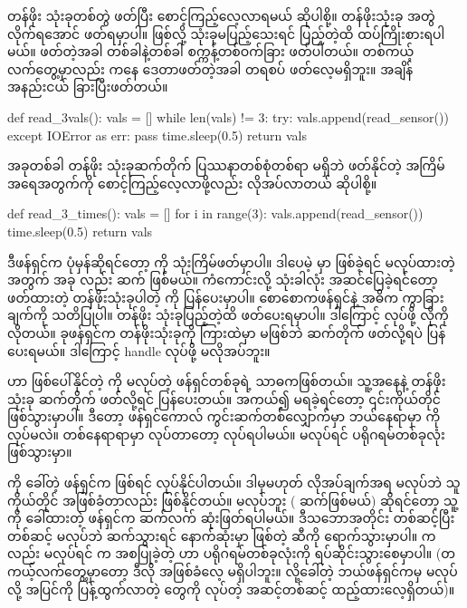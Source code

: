  တန်ဖိုး သုံးခုတစ်တွဲ ဖတ်ပြီး စောင့်ကြည့်လေ့လာရမယ် ဆိုပါစို့။ တန်ဖိုးသုံးခု အတွဲလိုက်ရအောင် ဖတ်ရမှာပါ။  ဖြစ်လို့ သုံးခုမပြည့်သေးရင် ပြည့်တဲ့ထိ ထပ်ကြိုးစားရပါမယ်။  ဖတ်တဲ့အခါ တစ်ခါနဲ့တစ်ခါ စက္ကန့်တစ်ဝက်ခြား ဖတ်ပါတယ်။ တစ်ကယ့် လက်တွေ့မှာလည်း  ကနေ ဒေတာဖတ်တဲ့အခါ တရစပ် ဖတ်လေ့မရှိဘူး။ အချိန်အနည်းငယ် ခြားပြီးဖတ်တယ်။
%
\begin{py}
def read_3vals():
    vals = []
    while len(vals) != 3:
        try:
            vals.append(read_sensor())
        except IOError as err:
            pass
        time.sleep(0.5)
    return vals
\end{py}
%

အခုတစ်ခါ  တန်ဖိုး သုံးခုဆက်တိုက် ပြဿနာတစ်စုံတစ်ရာ မရှိဘဲ ဖတ်နိုင်တဲ့ အကြိမ်အရေအတွက်ကို စောင့်ကြည့်လေ့လာဖို့လည်း လိုအပ်လာတယ် ဆိုပါစို့။ 

%
\begin{py}
def read_3_times():
    vals = []
    for i in range(3):
        vals.append(read_sensor())
        time.sleep(0.5)
    return vals
\end{py}
%
ဒီဖန်ရှင်က ပုံမှန်ဆိုရင်တော့   ကို သုံးကြိမ်ဖတ်မှာပါ။ ဒါပေမဲ့  မှာ   ဖြစ်ခဲ့ရင်  မလုပ်ထားတဲ့အတွက်  အခု  လည်း ဆက်  ဖြစ်မယ်။ ကံကောင်းလို့ သုံးခါလုံး အဆင်ပြေခဲ့ရင်တော့ ဖတ်ထားတဲ့ တန်ဖိုးသုံးခုပါတဲ့  ကို ပြန်ပေးမှာပါ။  စောစောကဖန်ရှင်နဲ့ အဓိက ကွာခြားချက်ကို သတိပြုပါ။  တန်ဖိုး သုံးခုပြည့်တဲ့ထိ ဖတ်ပေးရမှာပါ။ ဒါကြောင့်  လုပ်ဖို့ လိုကို လိုတယ်။ ခုဖန်ရှင်က တန်ဖိုးသုံးခုကို ကြားထဲမှာ  မဖြစ်ဘဲ ဆက်တိုက်  ဖတ်လို့ရပဲ ပြန်ပေးရမယ်။ ဒါကြောင့် {handle} လုပ်ဖို့ မလိုအပ်ဘူး။

 ဟာ ဖြစ်ပေါ်နိုင်တဲ့  ကို  မလုပ်တဲ့ ဖန်ရှင်တစ်ခုရဲ့ သာဓကဖြစ်တယ်။ သူ့အနေနဲ့ တန်ဖိုးသုံးခု ဆက်တိုက် ဖတ်လို့ရင် ပြန်ပေးတယ်။ အကယ်၍ မရခဲ့ရင်တော့  ၎င်းကိုယ်တိုင်  ဖြစ်သွားမှာပါ။ ဒီတော့ ဖန်ရှင်ကောလ် ကွင်းဆက်တစ်လျှောက်မှာ ဘယ်နေရာမှာ  ကို  လုပ်မလဲ။ တစ်နေရာရာမှာ လုပ်တာတော့ လုပ်ရပါမယ်။ မလုပ်ရင် ပရိုဂရမ်တစ်ခုလုံး  ဖြစ်သွားမှာ။

 ကို ခေါ်တဲ့ ဖန်ရှင်က   ဖြစ်ရင်  လုပ်နိုင်ပါတယ်။ ဒါမှမဟုတ် လိုအပ်ချက်အရ မလုပ်ဘဲ သူကိုယ်တိုင်  အဖြစ်ခံတာလည်း ဖြစ်နိုင်တယ်။  မလုပ်ဘူး ( ဆက်ဖြစ်မယ်) ဆိုရင်တော့ သူ့ကို ခေါ်ထားတဲ့ ဖန်ရှင်က  ဆက်လက် ဆုံးဖြတ်ရပါမယ်။ ဒီသဘောအတိုင်း တစ်ဆင့်ပြီးတစ်ဆင့်  မလုပ်ဘဲ ဆက်သွားရင် နောက်ဆုံးမှာ  ဖြစ်တဲ့  ဆီကို ရောက်သွားမှာပါ။  ကလည်း  မလုပ်ရင်  က အစပြုခဲ့တဲ့   ဟာ  ပရိုဂရမ်တစ်ခုလုံးကို ရပ်ဆိုင်းသွားစေမှာပါ။ (တကယ့်လက်တွေ့မှာတော့ ဒီလို အဖြစ်ခံလေ့ မရှိပါဘူး။  လို့ခေါ်တဲ့ ဘယ်ဖန်ရှင်ကမှ  မလုပ်လို့ အပြင်ကို ပြန့်ထွက်လာတဲ့  တွေကို  လုပ်တဲ့ အဆင့်တစ်ဆင့် ထည့်ထားလေ့ရှိတယ်)။

